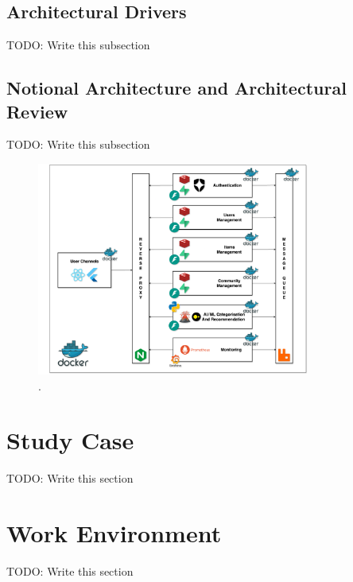 \subsection{Architectural Drivers} \label{section:architectural_drivers}

TODO: Write this subsection

\subsection{Notional Architecture and Architectural Review} \label{section:notional_architecture_and_architectural_review}

TODO: Write this subsection

\begin{figure}[!htb]
    \includegraphics[width=0.8\textwidth]{figs/chapter3/notional_arch.png}
    \centering
    \caption[Notional Architecture]{.}
    \label{fig:notional_arch}
\end{figure}


\section{Study Case} \label{section:case_study}

TODO: Write this section


\section{Work Environment} \label{section:work_environment}

TODO: Write this section


